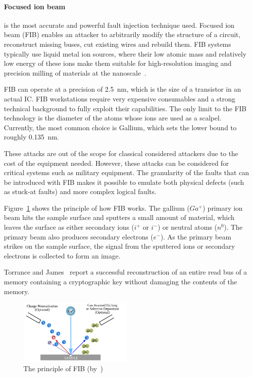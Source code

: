 \paragraph{Focused ion beam} is the most accurate and powerful fault injection technique used. Focused ion beam (FIB) enables an attacker to arbitrarily modify the structure of a circuit, reconstruct missing buses, cut existing wires and rebuild them. FIB systems typically use liquid metal ion sources, where their low atomic mass and relatively low energy of these ions make them suitable for high-resolution imaging and precision milling of materials at the nanoscale~\cite{FVMBMWP-23-wfiot}.

FIB can operate at a precision of \SI{2.5}{\nano\metre}, which is the size of a transistor in an actual IC.
FIB workstations require very expensive consumables and a strong technical background to fully exploit their capabilities. The only limit to the FIB technology is the diameter of the atoms whose ions are used as a scalpel. Currently, the most common choice is Gallium, which sets the lower bound to roughly \SI{0.135}{\nano\metre}.

These attacks are out of the scope for classical considered attackers due to the cost of the equipment needed. However, these attacks can be considered for critical systems such as military equipment. The granularity of the faults that can be introduced with FIB makes it possible to emulate both physical defects (such as stuck-at faults) and more complex logical faults.

Figure~\ref{fig:fib_setup} shows the principle of how FIB works. The gallium ($Ga^+$) primary ion beam hits the sample surface and sputters a small amount of material, which leaves the surface as either secondary ions ($i^+$ or $i^-$) or neutral atoms ($n^0$). The primary beam also produces secondary electrons ($e^-$). As the primary beam strikes on the sample surface, the signal from the sputtered ions or secondary electrons is collected to form an image.

Torrance and James~\cite{TJ-09-ches} report a successful reconstruction of an entire read bus of a memory containing a cryptographic key without damaging the contents of the memory.

\begin{figure}[ht]
    \centering
    \includegraphics[width=0.5\textwidth]{c2_soa/img/fib.png}
    \caption{The principle of FIB (by~\cite{fib-24-wikipedia})}
    \label{fig:fib_setup}
\end{figure}

